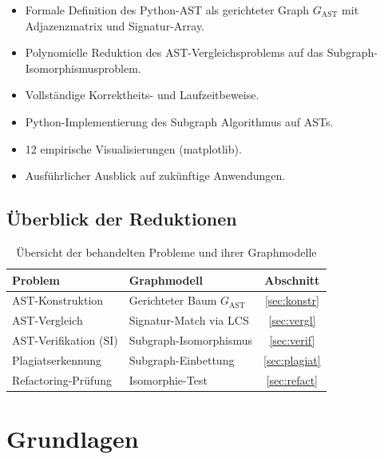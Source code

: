 ﻿\documentclass[a4paper,12pt]{article}
\theoremstyle{definition}
\begin{document}
\begin{itemize}
    \item Formale Definition des Python-AST als gerichteter Graph
          $G_{\mathrm{AST}}$ mit Adjazenzmatrix und Signatur-Array.
    \item Polynomielle Reduktion des AST-Vergleichsproblems auf das
          Subgraph-Isomorphismusproblem.
    \item Vollst\"andige Korrektheits- und Laufzeitbeweise.
    \item Python-Implementierung des Subgraph Algorithmus auf ASTs.
    \item 12 empirische Visualisierungen (matplotlib).
    \item Ausf\"uhrlicher Ausblick auf zuk\"unftige Anwendungen.
\end{itemize}

\subsection{\"Uberblick der Reduktionen}

\begin{table}[ht]
\centering
\renewcommand{\arraystretch}{1.3}
\begin{tabular}{|l|l|c|}
\hline
\textbf{Problem} & \textbf{Graphmodell} & \textbf{Abschnitt}\\
\hline
AST-Konstruktion        & Gerichteter Baum $G_{\mathrm{AST}}$   & \ref{sec:konstr}\\
AST-Vergleich           & Signatur-Match via LCS                & \ref{sec:vergl}\\
AST-Verifikation (SI)   & Subgraph-Isomorphismus                & \ref{sec:verif}\\
Plagiats\-erkennung     & Subgraph-Einbettung                   & \ref{sec:plagiat}\\
Refactoring-Pr\"ufung   & Isomorphie-Test                       & \ref{sec:refact}\\
\hline
\end{tabular}
\caption{\"Ubersicht der behandelten Probleme und ihrer Graphmodelle}
\label{tab:uebersicht}
\end{table}

\section{Grundlagen}
\end{document}
